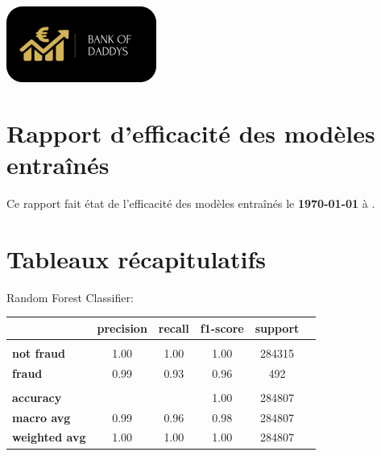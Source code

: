 \documentclass[10pt,a4paper]{article}
\begin{document}
\begin{center}
\includegraphics[scale=1]{views/img/background_splash} 
\end{center}
\section{Rapport d'efficacité des modèles entraînés }
\flushleft
\bigbreak  
\bigbreak  
Ce rapport fait état de l'efficacité des modèles entraînés le \textbf {\today{}}  à  \textbf {\DTMcurrenttime{}}.
\bigbreak  
\section{Tableaux récapitulatifs}
\flushleft
\bigbreak  
\bigbreak  
\large{ Random Forest Classifier:}
\flushleft
\bigbreak  
\normalsize
\begin{center}
\begin{tabular}{ l | c  c  c  c  c  }
 & \textbf{precision} & \textbf {recall} & \textbf {f1-score} & \textbf {support}\\
\hline
& & & &\\
\textbf {not fraud} & 1.00 & 1.00 & 1.00 & 284315 \\
\textbf {fraud} & 0.99 & 0.93 & 0.96 & 492\\
& & & &\\
\textbf {accuracy} &  & & 1.00 & 284807\\
\textbf {macro avg} & 0.99 & 0.96 & 0.98 & 284807\\
\textbf {weighted avg} & 1.00 & 1.00 & 1.00 & 284807\\
\end{tabular}
\end{center}
\end{document}
